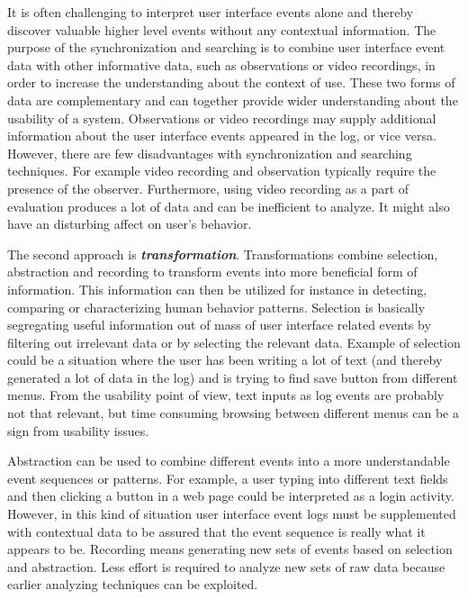 \documentclass[12pt,a4paper,oneside,pdftex]{report}
\begin{document}
It is often challenging to interpret user interface events alone and thereby discover valuable higher level events without any contextual information. The purpose of the synchronization and searching is to combine user interface event data with other informative data, such as observations or video recordings, in order to increase the understanding about the context of use. These two forms of data are complementary and can together provide wider understanding about the usability of a system. Observations or video recordings may supply additional information about the user interface events appeared in the log, or vice versa. However, there are few disadvantages with synchronization and searching techniques. For example video recording and observation typically require the presence of the observer. Furthermore, using video recording as a part of evaluation produces a lot of data and can be inefficient to analyze. It might also have an disturbing affect on user's behavior. \cite{RefWorks:25}

The second approach is \textbf{\emph{transformation}}. Transformations combine selection, abstraction and recording to transform events into more beneficial form of information. This information can then be utilized for instance in detecting, comparing or characterizing human behavior patterns. Selection is basically segregating useful information out of mass of user interface related events by filtering out irrelevant data or by selecting the relevant data. Example of selection could be a situation where the user has been writing a lot of text (and thereby generated a lot of data in the log) and is trying to find save button from different menus. From the usability point of view, text inputs as log events are probably not that relevant, but time consuming browsing between different menus can be a sign from usability issues. \cite{RefWorks:25}

Abstraction can be used to combine different events into a more understandable event sequences or patterns. For example, a user typing into different text fields and then clicking a button in a web page could be interpreted as a login activity. However, in this kind of situation user interface event logs must be supplemented with contextual data to be assured that the event sequence is really what it appears to be. Recording means generating new sets of events based on selection and abstraction. Less effort is required to analyze new sets of raw data because earlier analyzing techniques can be exploited. \cite{RefWorks:25}
\end{document}
